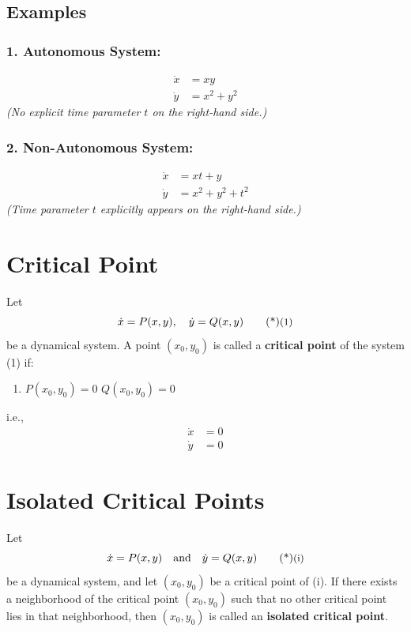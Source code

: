 \subsection*{Examples}

\subsubsection*{1. Autonomous System:}
\begin{align*}
    \dot{x} &= xy \\
    \dot{y} &= x^2 + y^2
\end{align*}
\noindent \textit{(No explicit time parameter $t$ on the right-hand side.)}

\subsubsection*{2. Non-Autonomous System:}
\begin{align*}
    \dot{x} &= xt + y \\
    \dot{y} &= x^2 + y^2 + t^2
\end{align*}
\noindent \textit{(Time parameter $t$ explicitly appears on the right-hand side.)}
\section*{Critical Point}

Let
\begin{equation}
    \dot{x} = P(x, y), \quad \dot{y} = Q(x, y) \sidenote{1}
\end{equation}
be a dynamical system. A point $(x_0, y_0)$ is called a \textbf{critical point} of the system (1) if:

\begin{enumerate}
    \item[(i)] $P(x_0, y_0) = 0$ \quad {} \quad $Q(x_0, y_0) = 0$
\end{enumerate}

\noindent i.e.,
\begin{align*}
    \dot{x} &= 0 \\
    \dot{y} &= 0
\end{align*}

\section*{Isolated Critical Points}

Let
\begin{equation}
    \dot{x} = P(x, y) \quad \text{and} \quad \dot{y} = Q(x, y) \sidenote{i}
\end{equation}
be a dynamical system, and let $(x_0, y_0)$ be a critical point of (i). If there exists a neighborhood of the critical point $(x_0, y_0)$ such that no other critical point lies in that neighborhood, then $(x_0, y_0)$ is called an \textbf{isolated critical point}.


